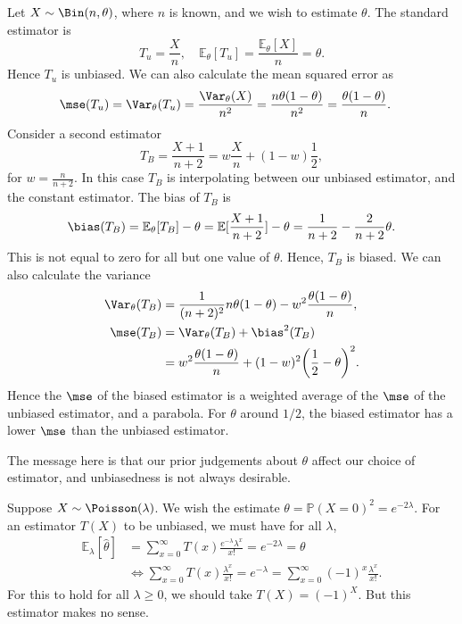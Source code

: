 \documentclass[12pt]{article}
\begin{document}
\begin{exbox}
	Let $X \sim \Bin(n, \theta)$, where $n$ is known, and we wish to estimate $\theta$. The standard estimator is
	\[
	T_u = \frac{X}{n}, \quad \mathbb{E}_\theta[T_u] = \frac{\mathbb{E}_\theta[X]}{n} = \theta
	.\]
	Hence $T_u$ is unbiased. We can also calculate the mean squared error as
	\begin{align*}
		\mse(T_u) &= \Var_\theta(T_u) = \frac{\Var_\theta(X)}{n^2} = \frac{n\theta(1-\theta)}{n^2} = \frac{\theta(1-\theta)}{n}.
	\end{align*}
	Consider a second estimator
	\[
	T_B = \frac{X+1}{n+2} = w\frac{X}{n} + (1-w)\frac{1}{2}
	,\]
	for $w = \frac{n}{n+2}$. In this case $T_B$ is interpolating between our unbiased estimator, and the constant estimator. The bias of $T_B$ is
	\[
	\bias(T_B) = \mathbb{E}_\theta[T_B] - \theta = \mathbb{E}[\frac{X+1}{n+2}] - \theta = \frac{1}{n+2} - \frac{2}{n+2}\theta
	.\]
	This is not equal to zero for all but one value of $\theta$. Hence, $T_B$ is biased. We can also calculate the variance
	\begin{align*}
		\Var_{\theta}(T_B) &= \frac{1}{(n+2)^2}n\theta(1-\theta) - w^2 \frac{\theta(1-\theta)}{n}, \\
		\mse(T_B) &= \Var_{\theta}(T_B) + \bias^2(T_B) \\
			  &= w^2\frac{\theta(1-\theta)}{n} + (1-w)^2 \biggl(\frac{1}{2} - \theta\biggr)^2.
	\end{align*}
	Hence the $\mse$ of the biased estimator is a weighted average of the $\mse$ of the unbiased estimator, and a parabola. For $\theta$ around $1/2$, the biased estimator has a lower $\mse$ than the unbiased estimator.
\end{exbox}

The message here is that our prior judgements about $\theta$ affect our choice of estimator, and unbiasedness is not always desirable.

\begin{exbox}
	Suppose $X \sim \Poisson(\lambda)$. We wish the estimate $\theta = \mathbb{P}(X = 0)^2 = e^{-2\lambda}$. For an estimator $T(X)$ to be unbiased, we must have for all $\lambda$,
	\begin{align*}
		\mathbb{E}_\lambda[\hat \theta] &= \sum_{x = 0}^{\infty}T(x) \frac{e^{-\lambda} \lambda^{x}}{x!} = e^{-2 \lambda} = \theta \\
						&\iff \sum_{x = 0}^{\infty}T(x) \frac{\lambda^{x}}{x!} = e^{-\lambda} = \sum_{x = 0}^{\infty}(-1)^{x} \frac{\lambda^{x}}{x!}.
	\end{align*}
	For this to hold for all $\lambda \geq 0$, we should take $T(X) = (-1)^{X}$. But this estimator makes no sense.
\end{exbox}


\newpage

\printindex
\end{document}
